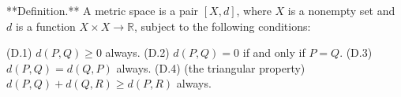 **Definition.** A metric space is a pair $[X, d]$, where $X$ is a nonempty set and $d$ is a function $X \times X \rightarrow \mathbb{R}$, subject to the following conditions:

(D.1) $d(P, Q) \geqslant 0$ always.
(D.2) $d(P, Q) = 0$ if and only if $P = Q$.
(D.3) $d(P, Q) = d(Q, P)$ always.
(D.4) (the triangular property) $d(P, Q) + d(Q, R) \geqslant d(P, R)$ always.
